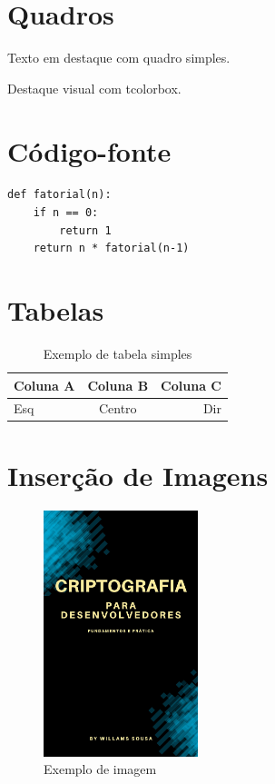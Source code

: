 \documentclass[12pt]{book}
\begin{document}
\section{Quadros}
\begin{framed}
Texto em destaque com quadro simples.
\end{framed}

\begin{tcolorbox}[colback=yellow!5!white,colframe=yellow!80!black,title=Nota]
Destaque visual com tcolorbox.
\end{tcolorbox}

\section{Código-fonte}

\begin{lstlisting}
def fatorial(n):
    if n == 0:
        return 1
    return n * fatorial(n-1)
\end{lstlisting}

\section{Tabelas}
\begin{table}[h]
\centering
\begin{tabular}{|l|c|r|}
\hline
Coluna A & Coluna B & Coluna C \\ \hline
Esq     & Centro    & Dir \\ \hline
\end{tabular}
\caption{Exemplo de tabela simples}
\label{tab:exemplo}
\end{table}

\section{Inserção de Imagens}
\begin{figure}[h]
    \centering
    \includegraphics[width=0.4\textwidth]{img/capa.jpg}
    \caption{Exemplo de imagem}
    \label{fig:exemplo}
\end{figure}
\end{document}
